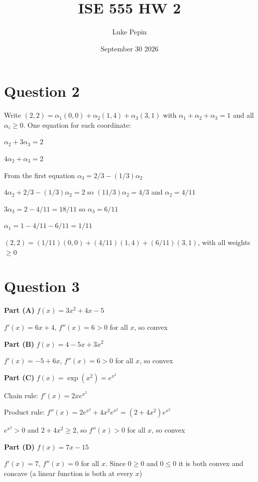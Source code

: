 \documentclass{article}
\title{ISE 555 HW 2}
\author{Luke Pepin}
\date{September 30 2026}
\begin{document}
\maketitle

\section*{Question 2}
Write $(2,2) = \alpha_1(0,0) + \alpha_2(1,4) + \alpha_3(3,1)$ with $\alpha_1 + \alpha_2 + \alpha_3 = 1$ and all $\alpha_i \ge 0$. One equation for each coordinate:

$\alpha_2 + 3\alpha_3 = 2$

$4\alpha_2 + \alpha_3 = 2$

From the first equation $\alpha_3 = 2/3 - (1/3)\alpha_2$

$4\alpha_2 + 2/3 - (1/3)\alpha_2 = 2$ so $(11/3)\alpha_2 = 4/3$ and $\alpha_2 = 4/11$

$3\alpha_3 = 2 - 4/11 = 18/11$ so $\alpha_3 = 6/11$

$\alpha_1 = 1 - 4/11 - 6/11 = 1/11$

$(2,2) = (1/11)(0,0) + (4/11)(1,4) + (6/11)(3,1)$, with all weights $\ge 0$

\section*{Question 3}
\textbf{Part (A)} $f(x) = 3x^2 + 4x - 5$

$f'(x) = 6x + 4$, $f''(x) = 6 > 0$ for all $x$, so convex

\textbf{Part (B)} $f(x) = 4 - 5x + 3x^2$

$f'(x) = -5 + 6x$, $f''(x) = 6 > 0$ for all $x$, so convex

\textbf{Part (C)} $f(x) = \exp(x^2) = e^{x^2}$

Chain rule: $f'(x) = 2xe^{x^2}$

Product rule: $f''(x) = 2e^{x^2} + 4x^2e^{x^2} = (2 + 4x^2)e^{x^2}$

$e^{x^2} > 0$ and $2 + 4x^2 \ge 2$, so $f''(x) > 0$ for all $x$, so convex

\textbf{Part (D)} $f(x) = 7x - 15$

$f'(x) = 7$, $f''(x) = 0$ for all $x$. Since $0 \ge 0$ and $0 \le 0$ it is both convex and concave (a linear function is both at every $x$)
\end{document}

